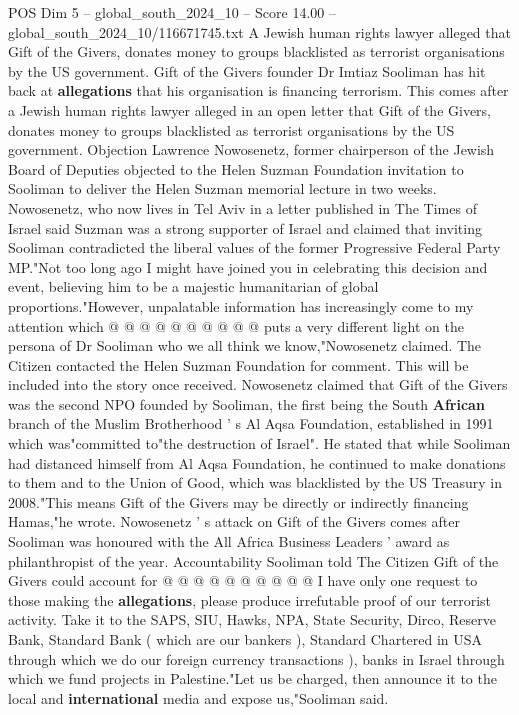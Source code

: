 \begin{textsample}{POS Dim 5 – global\_south\_2024\_10 – Score 14.00 – global\_south\_2024\_10/116671745.txt}  \label{ex:f5_pos_328}
A Jewish human rights lawyer alleged that Gift of the Givers, donates money to groups blacklisted as terrorist organisations by the US government.
Gift of the Givers founder Dr Imtiaz Sooliman has hit back at \textbf{allegations} that his organisation is financing terrorism.
This comes after a Jewish human rights lawyer alleged in an open letter that Gift of the Givers, donates money to groups blacklisted as terrorist organisations by the US government.
Objection Lawrence Nowosenetz, former chairperson of the Jewish Board of Deputies objected to the Helen Suzman Foundation invitation to Sooliman to deliver the Helen Suzman memorial lecture in two weeks.
Nowosenetz, who now lives in Tel Aviv in a letter published in The Times of Israel said Suzman was a strong supporter of Israel and claimed that inviting Sooliman contradicted the liberal values of the former Progressive Federal Party MP."Not too long ago I might have joined you in celebrating this decision and event, believing him to be a majestic humanitarian of global proportions."However, unpalatable information has increasingly come to my attention which @ @ @ @ @ @ @ @ @ @ puts a very different light on the persona of Dr Sooliman who we all think we know,"Nowosenetz claimed.
The Citizen contacted the Helen Suzman Foundation for comment.
This will be included into the story once received.
Nowosenetz claimed that Gift of the Givers was the second NPO founded by Sooliman, the first being the South \textbf{African} branch of the Muslim Brotherhood ' s Al Aqsa Foundation, established in 1991 which was"committed to"the destruction of Israel".
He stated that while Sooliman had distanced himself from Al Aqsa Foundation, he continued to make donations to them and to the Union of Good, which was blacklisted by the US Treasury in 2008."This means Gift of the Givers may be directly or indirectly financing Hamas,"he wrote.
Nowosenetz ' s attack on Gift of the Givers comes after Sooliman was honoured with the All Africa Business Leaders ' award as philanthropist of the year.
Accountability Sooliman told The Citizen Gift of the Givers could account for @ @ @ @ @ @ @ @ @ @ I have only one request to those making the \textbf{allegations}, please produce irrefutable proof of our terrorist activity.
Take it to the SAPS, SIU, Hawks, NPA, State Security, Dirco, Reserve Bank, Standard Bank ( which are our bankers ), Standard Chartered in USA through which we do our foreign currency transactions ), banks in Israel through which we fund projects in Palestine."Let us be charged, then announce it to the local and \textbf{international} media and expose us,"Sooliman said.

\end{textsample}
